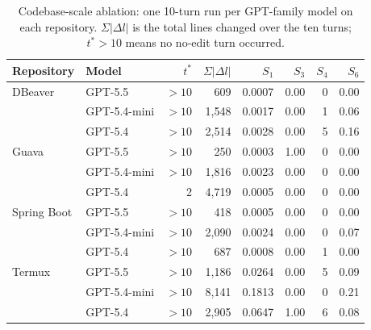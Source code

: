 \begin{table}[t]
\centering
\caption{Codebase-scale ablation: one 10-turn run per GPT-family model on each repository. $\Sigma|\Delta l|$ is the total lines changed over the ten turns; $t^{*}>10$ means no no-edit turn occurred.}
\label{tab:app-scale}
\small
\begin{tabular}{llrrrrrr}
\toprule
Repository & Model & $t^{*}$ & $\Sigma|\Delta l|$ & $S_1$ & $S_3$ & $S_4$ & $S_6$ \\
\midrule
DBeaver & GPT-5.5 & $>10$ & 609 & 0.0007 & 0.00 & 0 & 0.00 \\
 & GPT-5.4-mini & $>10$ & 1,548 & 0.0017 & 0.00 & 1 & 0.06 \\
 & GPT-5.4 & $>10$ & 2,514 & 0.0028 & 0.00 & 5 & 0.16 \\
\midrule
Guava & GPT-5.5 & $>10$ & 250 & 0.0003 & 1.00 & 0 & 0.00 \\
 & GPT-5.4-mini & $>10$ & 1,816 & 0.0023 & 0.00 & 0 & 0.00 \\
 & GPT-5.4 & 2 & 4,719 & 0.0005 & 0.00 & 0 & 0.00 \\
\midrule
Spring Boot & GPT-5.5 & $>10$ & 418 & 0.0005 & 0.00 & 0 & 0.00 \\
 & GPT-5.4-mini & $>10$ & 2,090 & 0.0024 & 0.00 & 0 & 0.07 \\
 & GPT-5.4 & $>10$ & 687 & 0.0008 & 0.00 & 1 & 0.00 \\
\midrule
Termux & GPT-5.5 & $>10$ & 1,186 & 0.0264 & 0.00 & 5 & 0.09 \\
 & GPT-5.4-mini & $>10$ & 8,141 & 0.1813 & 0.00 & 0 & 0.21 \\
 & GPT-5.4 & $>10$ & 2,905 & 0.0647 & 1.00 & 6 & 0.08 \\
\bottomrule
\end{tabular}
\end{table}
